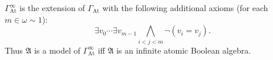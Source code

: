 $\Gamma_{\text{At}}^\infty$ is the extension of $\Gamma_{\text{At}}$ with the following additional axioms (for each $m \in \omega \sim 1$):
$$\exists v_0 \cdots \exists v_{m-1} \bigwedge_{i < j < m} \neg(v_i = v_j).$$
Thus $\mathfrak{A}$ is a model of $\Gamma_{\text{At}}^\infty$ iff $\mathfrak{A}$ is an infinite atomic Boolean algebra.
